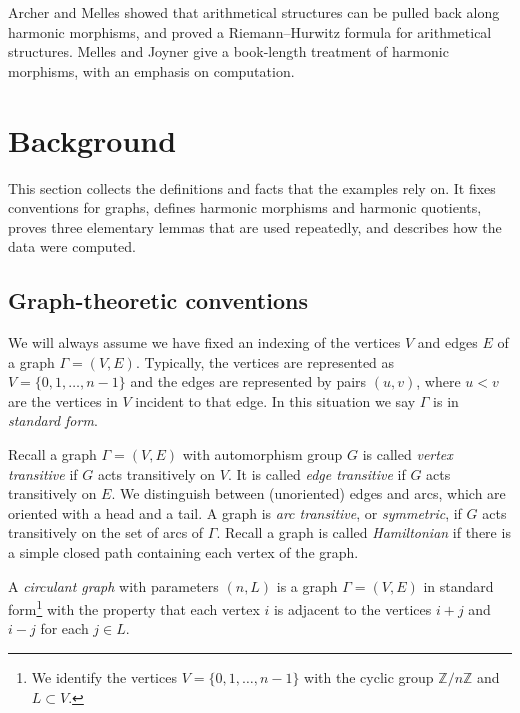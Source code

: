 \documentclass[12pt,letterpaper]{article}
\theoremstyle{definition}
\def\zzz{\mathbb{Z}}
\begin{document}
Archer and Melles \cite{AM25} showed that arithmetical structures can be
pulled back along harmonic morphisms, and proved a Riemann--Hurwitz formula
for arithmetical structures. Melles and Joyner \cite{MJ26} give a book-length
treatment of harmonic morphisms, with an emphasis on computation.

\section{Background}
\label{sec:background}

This section collects the definitions and facts that the examples rely on.
It fixes conventions for graphs, defines harmonic morphisms and harmonic
quotients, proves three elementary lemmas that are used repeatedly, and
describes how the data were computed.

\subsection{Graph-theoretic conventions}
\label{sec:conventions}


We will always assume we have fixed an indexing of the vertices $V$ and
edges $E$ of a graph $\Gamma = (V,E)$.
Typically, the vertices are represented as $V = \{0, 1, \dots , n - 1\}$
and the edges are represented by pairs $(u, v)$, where $u < v$
are the vertices in $V$ incident to that edge.
In this situation we say $\Gamma$ is in {\it standard form}.

Recall a graph $\Gamma=(V,E)$ with automorphism group $G$ is
called {\it vertex transitive} if $G$ acts transitively on $V$.
It is called {\it edge transitive} if $G$ acts transitively on $E$.
We distinguish between (unoriented) edges and arcs, which are
oriented with a head and a tail. A graph is {\it arc transitive},
or {\it symmetric}, if $G$ acts transitively on the set of arcs
of $\Gamma$.
Recall a
graph is called {\it Hamiltonian} if there is a simple closed path
containing each vertex of the graph.

A {\it circulant graph} with parameters $(n,L)$ is a
graph $\Gamma=(V,E)$ in standard form\footnote{We identify the
vertices $V=\{0,1,\dots,n-1\}$ with the cyclic group
$\zzz/n\zzz$ and $L\subset V$.} with the property
that each vertex $i$ is adjacent to
the vertices $i+j$ and $i-j$ for each $j \in L$.
\end{document}
